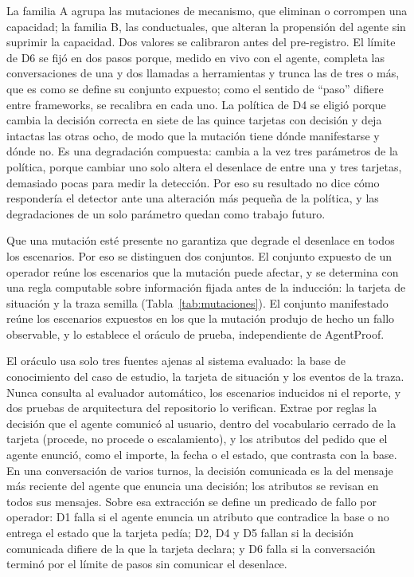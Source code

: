 La familia A agrupa las mutaciones de mecanismo, que eliminan o corrompen una capacidad; la familia B, las conductuales, que alteran la propensión del agente sin suprimir la capacidad. Dos valores se calibraron antes del pre-registro. El límite de D6 se fijó en dos pasos porque, medido en vivo con el agente, completa las conversaciones de una y dos llamadas a herramientas y trunca las de tres o más, que es como se define su conjunto expuesto; como el sentido de ``paso'' difiere entre frameworks, se recalibra en cada uno. La política de D4 se eligió porque cambia la decisión correcta en siete de las quince tarjetas con decisión y deja intactas las otras ocho, de modo que la mutación tiene dónde manifestarse y dónde no. Es una degradación compuesta: cambia a la vez tres parámetros de la política, porque cambiar uno solo altera el desenlace de entre una y tres tarjetas, demasiado pocas para medir la detección. Por eso su resultado no dice cómo respondería el detector ante una alteración más pequeña de la política, y las degradaciones de un solo parámetro quedan como trabajo futuro.
\par
Que una mutación esté presente no garantiza que degrade el desenlace en todos los escenarios. Por eso se distinguen dos conjuntos. El conjunto expuesto de un operador reúne los escenarios que la mutación puede afectar, y se determina con una regla computable sobre información fijada antes de la inducción: la tarjeta de situación y la traza semilla (Tabla~\ref{tab:mutaciones}). El conjunto manifestado reúne los escenarios expuestos en los que la mutación produjo de hecho un fallo observable, y lo establece el oráculo de prueba, independiente de AgentProof.
\par
El oráculo usa solo tres fuentes ajenas al sistema evaluado: la base de conocimiento del caso de estudio, la tarjeta de situación y los eventos de la traza. Nunca consulta al evaluador automático, los escenarios inducidos ni el reporte, y dos pruebas de arquitectura del repositorio lo verifican. Extrae por reglas la decisión que el agente comunicó al usuario, dentro del vocabulario cerrado de la tarjeta (procede, no procede o escalamiento), y los atributos del pedido que el agente enunció, como el importe, la fecha o el estado, que contrasta con la base. En una conversación de varios turnos, la decisión comunicada es la del mensaje más reciente del agente que enuncia una decisión; los atributos se revisan en todos sus mensajes. Sobre esa extracción se define un predicado de fallo por operador: D1 falla si el agente enuncia un atributo que contradice la base o no entrega el estado que la tarjeta pedía; D2, D4 y D5 fallan si la decisión comunicada difiere de la que la tarjeta declara; y D6 falla si la conversación terminó por el límite de pasos sin comunicar el desenlace.
